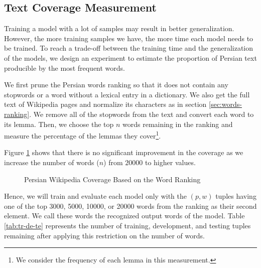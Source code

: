 \documentclass{article}
\begin{document}
\subsection{Text Coverage Measurement \label{sec:text-coverage-measurement}}
Training a model with a lot of samples may result in better generalization. However, the more training samples we have, the more time each model needs to be trained. To reach a trade-off between the training time and the generalization of the models, we design an experiment to estimate the proportion of Persian text producible by the most frequent words.

We first prune the Persian words ranking so that it does not contain any stopwords or a word without a lexical entry in a dictionary.
We also get the full text of Wikipedia pages and normalize its characters as  in section \ref{sec:words-ranking}.
We remove all of the stopwords from the text and convert each word to its lemma. Then, we choose the top $n$  words remaining in the ranking and measure the percentage of the lemmas they cover\footnote{We consider the frequency of each lemma in this measurement.}.

Figure \ref{fig:wiki-coverage} shows that there is no significant improvement in the coverage as we increase the number of words ($n$) from $20000$ to higher values.

\begin{figure}[ht]
	\caption{Persian Wikipedia Coverage Based on the Word Ranking}
	
	\label{fig:wiki-coverage}
\end{figure}

Hence, we will train and evaluate each model only with the $(p,w)$ tuples having one of the top 3000, 5000, 10000, or 20000 words from the ranking as their second element. We call these words the recognized output words of the model. Table \ref{tab:tr-de-te} represents the number of training, development, and testing tuples remaining after applying this restriction on the number of words.
\end{document}
